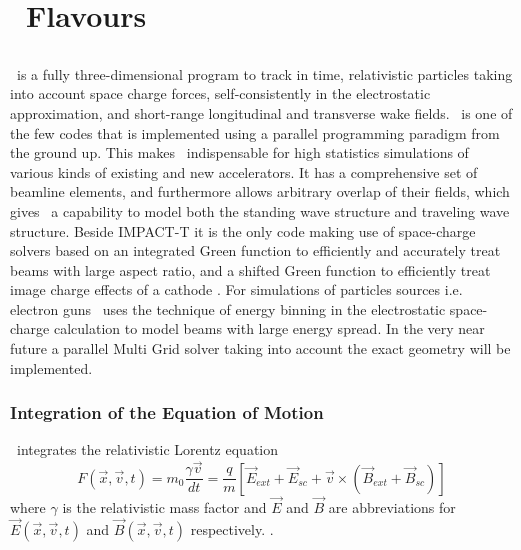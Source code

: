 \chapter{\opal\ Flavours}
\label{chp:opalFlavours}

\section{\opalt}
\opalt\ is a fully three-dimensional program to track in time, relativistic particles taking into account space charge forces, self-consistently in the electrostatic approximation, and short-range longitudinal and transverse wake fields. \opalt\ is one of the few
codes  that is implemented using a parallel programming paradigm from the ground up. This makes \opalt\ indispensable for
high statistics simulations of various kinds of existing and new accelerators. It has a comprehensive set of beamline
elements, and furthermore allows arbitrary overlap of their fields, which gives \opalt\ a capability
to model both the standing wave structure and traveling wave structure. Beside IMPACT-T it is the only code making use of
space-charge solvers based on an integrated Green \cite{qiang2005} function to efficiently and accurately treat beams with
large aspect ratio, and a shifted Green function to efficiently treat image charge effects of a cathode \cite{fubiani2006,qiang2006-2}. 
For simulations of particles sources i.e. electron guns \opalt\ uses the technique of  energy binning in the electrostatic space-charge calculation to model beams with large
energy spread. In the very near future a parallel Multi Grid solver taking into account the exact geometry will be implemented.  

\subsection{Integration of the Equation of Motion}
\opalt\ integrates the relativistic Lorentz equation
\begin{equation}
F(\vec{x},\vec{v},t) = m_0 \frac{\gamma \vec{v}}{dt} =   \frac{q}{m}[\vec{E}_{ext} + \vec{E}_{sc} + \vec{v} \times (\vec{B}_{ext} + \vec{B}_{sc})]
\end{equation}
where $\gamma$ is the relativistic mass factor and $\vec{E}$  and $\vec{B}$ are abbreviations for $\vec{E}(\vec{x},\vec{v},t)$ and $\vec{B}(\vec{x},\vec{v},t)$
respectively. \latermore .


